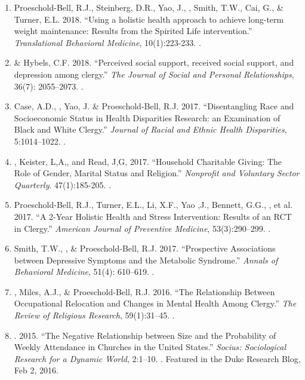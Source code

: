 \begin{enumerate}
\item Proeschold-Bell, R.J., Steinberg, D.R., Yao, J., \Tian, Smith, T.W., Cai, G., \& Turner, E.L. 2018. ``Using a holistic health approach to achieve long-term weight maintenance: Results from the Spirited Life intervention.'' \emph{Translational Behavioral Medicine}, 10(1):223-233. .

\item \Tian \& Hybels, C.F. 2018. ``Perceived social support, received social support, and depression among clergy.'' \emph{The Journal of Social and Personal Relationships}, 36(7): 2055--2073. .

\item Case, A.D., \Tian, Yao, J. \& Proeschold-Bell, R.J. 2017. ``Disentangling Race and Socioeconomic Status in Health Disparities Research: an Examination of Black and White Clergy.'' \emph{Journal of Racial and Ethnic Health Disparities}, 5:1014--1022. .

\item \Tian, Keister, L,A,, and Read, J,G, 2017. ``Household Charitable Giving: The Role of Gender, Marital Status and Religion.'' \emph{Nonprofit and Voluntary Sector Quarterly}. 47(1):185-205. .

\item Proeschold-Bell, R.J., Turner, E.L., Li, X.F., Yao ,J., Bennett, G.G., \Tian, et al. 2017. ``A 2-Year Holistic Health and Stress Intervention: Results of an RCT in Clergy.'' \emph{American Journal of Preventive Medicine}, 53(3):290--299. .

\item Smith, T.W., \Tian\CF, \& Proeschold-Bell, R.J. 2017. ``Prospective Associations between Depressive Symptoms and the Metabolic Syndrome.'' \emph{Annals of Behavioral Medicine}, 51(4): 610--619. .

\item \Tian, Miles, A.J., \& Proeschold-Bell, R.J. 2016. ``The Relationship Between Occupational Relocation and Changes in Mental Health Among Clergy.'' \emph{The Review of Religious Research}, 59(1):31--45. .

\item \Tian. 2015. ``The Negative Relationship between Size and the Probability of Weekly Attendance in Churches in the United States.'' \emph{Socius: Sociological Research for a Dynamic World}, 2:1--10.  . Featured in the Duke Research Blog, Feb 2, 2016.


\end{enumerate}

